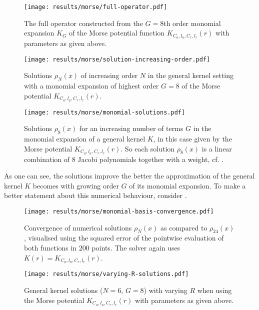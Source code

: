 \begin{figure}[H]
  \centering
  \texttt{[image: results/morse/full-operator.pdf]}
  \caption[Full Morse operator]{The full operator constructed from the $G=8$th order monomial expansion $K_G$ of the Morse potential function $K_{C_a, l_a, C_r, l_r}(r)$ with parameters as given above.}
  \label{fig:morse-operator}
\end{figure}

\begin{figure}[H]
  \centering
  \texttt{[image: results/morse/solution-increasing-order.pdf]}
  \caption[General kernel solutions of increasing order]{Solutions $\rho_N(x)$ of increasing order $N$ in the general kernel setting with a monomial expansion of highest order $G = 8$ of the Morse potential $K_{C_a, l_a, C_r, l_r}(r)$.}
  \label{fig:morse-solution-increasing-order}
\end{figure}

\begin{figure}[H]
  \centering
  \texttt{[image: results/morse/monomial-solutions.pdf]}
  \caption[]{Solutions $\rho_8(x)$ for an increasing number of terms $G$ in the monomial expansion of a general kernel $K$, in this case given by the Morse potential $K_{C_a, l_a, C_r, l_r}(r)$. So each solution $\rho_8(x)$ is a linear combination of $8$ Jacobi polynomials together with a weight, cf. .}
  \label{fig:monomial-solutions}
\end{figure}

As one can see, the solutions improve the better the approximation of the general kernel $K$ becomes with growing order $G$ of its monomial expansion.
To make a better statement about this numerical behaviour, consider .

\begin{figure}[H]
  \centering
  \texttt{[image: results/morse/monomial-basis-convergence.pdf]}
  \caption[Step-by-step convergence of solutions when increasing the degree of the monomial]{
    Convergence of numerical solutions $\rho_N(x)$ as compared to $\rho_{24}(x)$, visualised using the squared error of the pointwise evaluation of both functions in $200$ points.
    The solver again uses $K(r) = K_{C_a, l_a, C_r, l_r}(r)$.
  }
  \label{fig:monomial-basis-convergence}
\end{figure}

\begin{figure}[H]
  \centering
  \texttt{[image: results/morse/varying-R-solutions.pdf]}
  \caption[Solutions with varying $R$]{General kernel solutions ($N = 6$, $G = 8$) with varying $R$ when using the Morse potential $K_{C_a, l_a, C_r, l_r}(r)$ with parameters as given above.}
  \label{fig:varying-R-solutions}
\end{figure}
